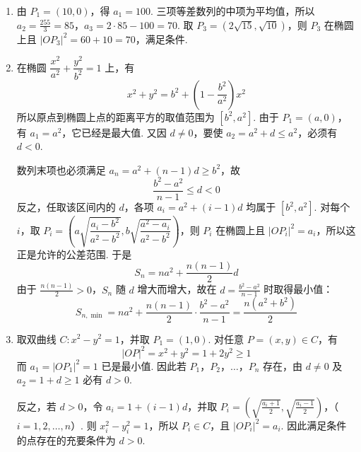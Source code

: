\begin{solution}
\begin{enumerate}
\item 由 \(P_{1}=(10,0)\)，得 \(a_{1}=100\). 三项等差数列的中项为平均值，所以 \(a_{2}=\frac{255}{3}=85\)，\(a_{3}=2\cdot85-100=70\). 取 \(P_{3}=(2\sqrt{15},\sqrt{10})\)，则 \(P_{3}\) 在椭圆上且 \(|OP_{3}|^{2}=60+10=70\)，满足条件.

\item 在椭圆 \(\dfrac{x^{2}}{a^{2}}+\dfrac{y^{2}}{b^{2}}=1\) 上，有
\[
x^{2}+y^{2}=b^{2}+\left(1-\frac{b^{2}}{a^{2}}\right)x^{2}
\]
所以原点到椭圆上点的距离平方的取值范围为 \([b^{2},a^{2}]\). 由于 \(P_{1}=(a,0)\)，有 \(a_{1}=a^{2}\)，它已经是最大值. 又因 \(d\neq0\)，要使 \(a_{2}=a^{2}+d\leqslant a^{2}\)，必须有 \(d<0\).

数列末项也必须满足 \(a_{n}=a^{2}+(n-1)d\geqslant b^{2}\)，故
\[
\frac{b^{2}-a^{2}}{n-1}\leqslant d<0
\]
反之，任取该区间内的 \(d\)，各项 \(a_{i}=a^{2}+(i-1)d\) 均属于 \([b^{2},a^{2}]\). 对每个 \(i\)，取
\(P_{i}=\left(a\sqrt{\dfrac{a_{i}-b^{2}}{a^{2}-b^{2}}},b\sqrt{\dfrac{a^{2}-a_{i}}{a^{2}-b^{2}}}\right)\)，则 \(P_{i}\) 在椭圆上且 \(\left|OP_{i}\right|^{2}=a_{i}\)，所以这正是允许的公差范围. 于是
\[
S_{n}=na^{2}+\frac{n(n-1)}{2}d
\]
由于 \(\frac{n(n-1)}{2}>0\)，\(S_{n}\) 随 \(d\) 增大而增大，故在 \(d=\frac{b^{2}-a^{2}}{n-1}\) 时取得最小值：
\[
S_{n,\min}=na^{2}+\frac{n(n-1)}{2}\cdot\frac{b^{2}-a^{2}}{n-1}=\frac{n(a^{2}+b^{2})}{2}
\]

\item 取双曲线 \(C\colon x^{2}-y^{2}=1\)，并取 \(P_{1}=(1,0)\). 对任意 \(P=(x,y)\in C\)，有
\[
|OP|^{2}=x^{2}+y^{2}=1+2y^{2}\geqslant1
\]
而 \(a_{1}=|OP_{1}|^{2}=1\) 已是最小值. 因此若 \(P_{1}\)，\(P_{2}\)，\(\ldots\)，\(P_{n}\) 存在，由 \(d\neq0\) 及 \(a_{2}=1+d\geqslant1\) 必有 \(d>0\).

反之，若 \(d>0\)，令 \(a_{i}=1+(i-1)d\)，并取
\(P_{i}=\left(\sqrt{\frac{a_{i}+1}{2}},\sqrt{\frac{a_{i}-1}{2}}\right)\)，（\(i=1,2,\ldots,n\)）.
则 \(x_{i}^{2}-y_{i}^{2}=1\)，所以 \(P_{i}\in C\)，且 \(|OP_{i}|^{2}=a_{i}\). 因此满足条件的点存在的充要条件为 \(d>0\).
\end{enumerate}
\end{solution}

